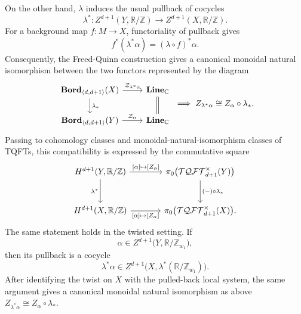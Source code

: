 \documentclass[aps,prx,reprint,superscriptaddress,twocolumn,amsmath,amssymb,amsfonts, nofootinbib]{revtex4-2}
\newcommand{\bordd}{{\bf Bord}_{\langle d, d+1\rangle}}
\newcommand{\Line}{{\bf Line}_{\mathbb{C}}}
\newcommand{\tqftd}{\mathcal{TQFT}_{d+1}}
\newcommand{\Z}{\mathbb{Z}}
\theoremstyle{apsstyle}
\begin{document}
\bigskip 

On the other hand, $\lambda$ induces the usual pullback of cocycles
\begin{equation*}
\lambda^*:
Z^{d+1}(Y,\mathbb R/\Z)
\longrightarrow
Z^{d+1}(X,\mathbb R/\Z).
\end{equation*}
For a background map $f:M\to X$, functoriality of pullback gives
\begin{equation*}
    f^*(\lambda^*\alpha) = (\lambda\circ f)^*\alpha.
\end{equation*}
Consequently, the Freed-Quinn construction gives a canonical monoidal natural isomorphism between the two functors represented by the diagram
\begin{equation*}
\begin{tikzcd}
    \bordd(X) \arrow[r, "\mathcal{Z}_{\lambda^{*}\alpha}"] \arrow[d, "\lambda_{*}"] & \Line \arrow[equal]{d}\\
    \bordd(Y) \arrow[r, "\mathcal{Z}_{\alpha}"] & \Line 
\end{tikzcd}
\implies 
Z_{\lambda^*\alpha} \cong Z_\alpha\circ\lambda_*.
\end{equation*}
Passing to cohomology classes and monoidal-natural-isomorphism classes of TQFTs, this compatibility is expressed by the commutative square
\begin{equation}
\label{eq:bord_nat_sq1}
\begin{tikzcd}[column sep=large,row sep=large]
H^{d+1}(Y,\mathbb R/\Z)
\arrow[r,"\text{[}\alpha\text{]}\mapsto\text{[}Z_\alpha\text{]}"]
\arrow[d,"\lambda^*"']
&
\pi_0\bigl(\tqftd^\times(Y)\bigr)
\arrow[d,"(-)\circ\lambda_*"]
\\
H^{d+1}(X,\mathbb R/\Z)
\arrow[r,"\text{[}\alpha\text{]}\mapsto\text{[}Z_\alpha\text{]}"']
&
\pi_0\bigl(\tqftd^\times(X)\bigr).
\end{tikzcd}
\end{equation}
The same statement holds in the twisted setting. If
\begin{equation*}
    \alpha\in
    Z^{d+1}\bigl(Y,\mathbb R/\Z_{w_1}\bigr),
\end{equation*}
then its pullback is a cocycle
\begin{equation*}
    \lambda^*\alpha
    \in
    Z^{d+1}\bigl(
        X,\lambda^*(\mathbb R/\Z_{w_1})
    \bigr).
\end{equation*}
After identifying the twist on $X$ with the pulled-back local system,
the same argument gives a canonical monoidal natural isomorphism as above $Z_{\lambda^*\alpha}\cong Z_\alpha\circ\lambda_*$.
\end{document}
